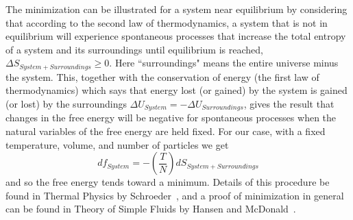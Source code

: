\documentclass[double,12pt]{beavtex}
\begin{document}
The minimization can be illustrated for a system near 
equilibrium by considering that according to the 
second law of thermodynamics, a system that is not in equilibrium will 
experience spontaneous processes that increase the total entropy of a 
system and its surroundings until equilibrium is reached, 
$\Delta{S}_{System + Surroundings} \geq 0$. Here ``surroundings" means 
the entire universe minus the system. This, together with the conservation 
of energy (the first law of thermodynamics) which says that energy lost 
(or gained) by the system is gained (or lost) by the surroundings 
$\Delta{U}_{System}=-\Delta{U}_{Surroundings}$, gives the result that 
changes in the free energy 
will be negative for spontaneous processes 
when the natural variables of the free energy are held fixed. 
For our case, with a fixed temperature, volume, and number of particles
we get
\begin{equation}
  df_{System}=-\left(\frac{T}{N}\right)dS_{System+Surroundings}
\end{equation}
and so the free energy tends toward a minimum. 
Details of this procedure be found in Thermal Physics by Schroeder~\cite{schroeder}, 
and a proof of minimization in general can be found in 
Theory of Simple Fluids by Hansen and McDonald~\cite{Hansen}.
\end{document}
